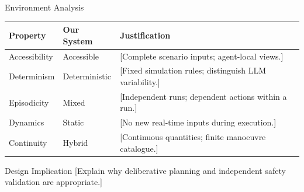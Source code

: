 

\begin{frame}{Environment Analysis}

\small

\begin{table}
\centering
\begin{tabular}{p{2.2cm}p{2.4cm}p{5.1cm}}
\toprule
\textbf{Property} &
\textbf{Our System} &
\textbf{Justification} \\
\midrule

Accessibility &
Accessible &
[Complete scenario inputs; agent-local views.] \\

Determinism &
Deterministic &
[Fixed simulation rules; distinguish LLM variability.] \\

Episodicity &
Mixed &
[Independent runs; dependent actions within a run.] \\

Dynamics &
Static &
[No new real-time inputs during execution.] \\

Continuity &
Hybrid &
[Continuous quantities; finite manoeuvre catalogue.] \\

\bottomrule
\end{tabular}
\end{table}

\vspace{0.2cm}

\begin{block}{Design Implication}
    [Explain why deliberative planning and
    independent safety validation are appropriate.]
\end{block}

\end{frame}
